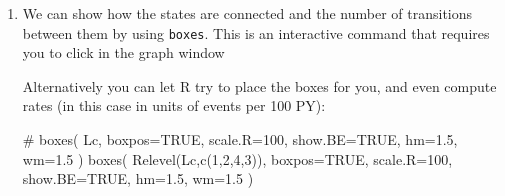 \begin{enumerate}

\item We can show how the states are connected and the number of transitions
  between them by using \texttt{boxes}. This is an interactive command
  that requires you to click in the graph window

  Alternatively you can let R try to place the boxes for you, and even
  compute rates (in this case in units of events per 100 PY):
\begin{Schunk}
\begin{Sinput}
 # boxes( Lc, boxpos=TRUE, scale.R=100, show.BE=TRUE, hm=1.5, wm=1.5 )
 boxes( Relevel(Lc,c(1,2,4,3)),
        boxpos=TRUE, scale.R=100, show.BE=TRUE, hm=1.5, wm=1.5 )
\end{Sinput}
\end{Schunk}



\end{enumerate}
